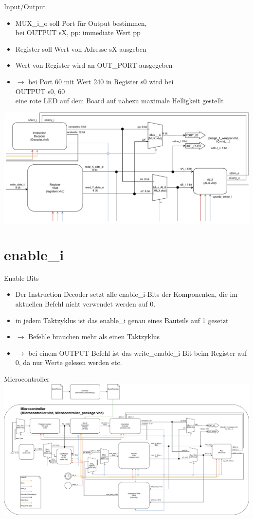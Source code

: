 \documentclass[10pt, t,
aspectratio=169,%
usenames,
dvipsnames,
]{beamer}
\begin{document}
	\begin{frame}{Input/Output}
		\begin{itemize}
			\item MUX\_i\_o soll Port für Output bestimmen, \\ bei OUTPUT sX, pp: immediate Wert pp
			\item Register soll Wert von Adresse sX ausgeben
			\item Wert von Register wird an OUT\_PORT ausgegeben
			\item $\rightarrow$ bei Port 60 mit Wert 240 in Register s0 wird bei \\
			OUTPUT s0, 60 \\
			eine rote LED auf dem Board auf nahezu maximale Helligkeit gestellt
		\end{itemize}
		\includegraphics[width=.65\linewidth]{../Blockbeschreibungen/IO-BlockdiagramSnipits.pdf}
	\end{frame}
	
	\section{enable\_i}
	
	\begin{frame}{Enable Bits}
		\begin{itemize}
			\item Der Instruction Decoder setzt alle enable\_i-Bits der Komponenten, die im aktuellen Befehl nicht verwendet werden auf 0.
			\item in jedem Taktzyklus ist das enable\_i genau eines Bauteils auf 1 gesetzt
			\item $\rightarrow$ Befehle brauchen mehr als einen Taktzyklus
			\item $\rightarrow$ bei einem OUTPUT Befehl ist das write\_enable\_i Bit beim Register auf 0, da nur Werte gelesen werden etc.
		\end{itemize}
	\end{frame}

	\begin{frame}{Microcontroller}
		\includegraphics[width=.95\linewidth]{../Blockbeschreibungen/BlockdiagramMitVHDL.pdf}
	\end{frame}
\end{document}
